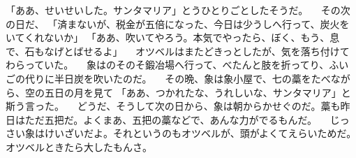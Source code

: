「ああ、せいせいした。サンタマリア」とうひとりごとしたそうだ。
　その次の日だ、
「済まないが、税金が五倍になった、今日は少うしへ行って、炭火をいてくれないか」
「ああ、吹いてやろう。本気でやったら、ぼく、もう、息で、石もなげとばせるよ」
　オツベルはまたどきっとしたが、気を落ち付けてわらっていた。
　象はのそのそ鍛冶場へ行って、べたんと肢を折ってり、ふいごの代りに半日炭を吹いたのだ。
　その晩、象は象小屋で、七の藁をたべながら、空の五日の月を見て
「ああ、つかれたな、うれしいな、サンタマリア」と斯う言った。
　どうだ、そうして次の日から、象は朝からかせぐのだ。藁も昨日はただ五把だ。よくまあ、五把の藁などで、あんな力がでるもんだ。
　じっさい象はけいざいだよ。それというのもオツベルが、頭がよくてえらいためだ。オツベルときたら大したもんさ。
　
